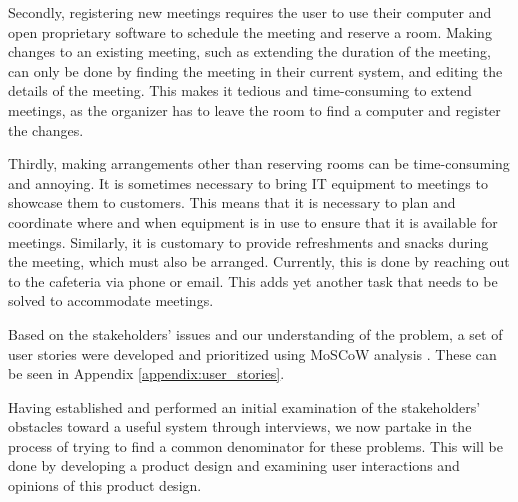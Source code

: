 Secondly, registering new meetings requires the user to use their computer and open proprietary software to schedule the meeting and reserve a room.
Making changes to an existing meeting, such as extending the duration of the meeting, can only be done by finding the meeting in their current system, and editing the details of the meeting.
This makes it tedious and time-consuming to extend meetings, as the organizer has to leave the room to find a computer and register the changes.

Thirdly, making arrangements other than reserving rooms can be time-consuming and annoying. 
It is sometimes necessary to bring IT equipment to meetings to showcase them to customers.
This means that it is necessary to plan and coordinate where and when equipment is in use to ensure that it is available for meetings. 
Similarly, it is customary to provide refreshments and snacks during the meeting, which must also be arranged. 
Currently, this is done by reaching out to the cafeteria via phone or email.
This adds yet another task that needs to be solved to accommodate meetings.

Based on the stakeholders' issues and our understanding of the problem, a set of user stories were developed and prioritized using MoSCoW analysis \cite{DEBbook}.
These can be seen in Appendix \ref{appendix:user_stories}.

Having established and performed an initial examination of the stakeholders' obstacles toward a useful system through interviews, we now partake in the process of trying to find a common denominator for these problems.
This will be done by developing a product design and examining user interactions and opinions of this product design.